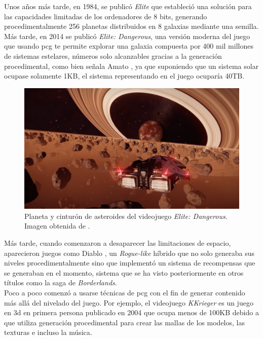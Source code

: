Unos años más tarde, en 1984, se publicó \textit{Elite} \cite{braben2007} que estableció una solución para las capacidades limitadas de los ordenadores de 8 bits, generando procedimentalmente 256 planetas distribuidos en 8 galaxias mediante una semilla. Más tarde, en 2014 se publicó \textit{Elite: Dangerous}, una versión moderna del juego que usando \acrshort{pcg} te permite explorar una galaxia compuesta por 400 mil millones de sistemas estelares, números solo alcanzables gracias a la generación procedimental, como bien señala Amato \cite{amato2017}, ya que suponiendo que un sistema solar ocupase solamente 1\acrshort{KB}, el sistema representando en el juego ocuparía 40\acrshort{TB}.\\

\begin{figure}[H]
    \begin{center}
        \includegraphics[scale=0.23]{img/elitedangerous.jpg}
        \caption{Planeta y cinturón de asteroides del videojuego \textit{Elite: Dangerous}. Imagen obtenida de \cite{eliteDangerous}.}
    \end{center}
\end{figure}

Más tarde, cuando comenzaron a desaparecer las limitaciones de espacio, aparecieron juegos como Diablo \cite{diablo}, un \textit{Rogue-like} híbrido que no solo generaba sus niveles procedimentalmente sino que implementó un sistema de recompensas que se generaban en el momento, sistema que se ha visto posteriormente en otros títulos como la saga de \textit{Borderlands}.\\

Poco a poco comenzó a usarse técnicas de \acrshort{pcg} con el fin de generar contenido más allá del nivelado del juego. Por ejemplo, el videojuego \textit{KKrieger} \cite{kosh} es un juego en \acrshort{3d} en primera persona publicado en 2004 que ocupa menos de 100\acrshort{KB} debido a que utiliza generación procedimental para crear las mallas de los modelos, las texturas e incluso la música.

